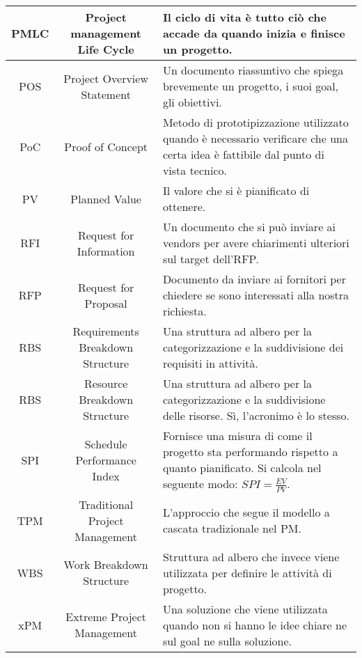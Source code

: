 \begin{tabularx}{\textwidth}{|c|c|X|}
	\hline
	PMLC & Project management Life Cycle & Il ciclo di vita è tutto ciò che accade da quando inizia e finisce un progetto.\\
	\hline
	POS & Project Overview Statement & Un documento riassuntivo che spiega brevemente un progetto, i suoi goal, gli obiettivi. \\
	\hline
	PoC & Proof of Concept & Metodo di prototipizzazione utilizzato quando è necessario verificare che una certa idea è fattibile dal punto di vista tecnico.\\
	\hline
	PV & Planned Value & Il valore che si è pianificato di ottenere.\\
	\hline
	RFI & Request for Information & Un documento che si può inviare ai vendors per avere chiarimenti ulteriori sul target dell'RFP. \\
	\hline
	RFP & Request for Proposal & Documento da inviare ai fornitori per chiedere se sono interessati alla nostra richiesta. \\
	\hline
	RBS & Requirements Breakdown Structure & Una struttura ad albero per la categorizzazione e la suddivisione dei requisiti in attività. \\
	\hline
	RBS & Resource Breakdown Structure & Una struttura ad albero per la categorizzazione e la suddivisione delle risorse. Sì, l'acronimo è lo stesso. \\
	\hline
	SPI & Schedule Performance Index & Fornisce una misura di come il progetto sta performando rispetto a quanto
	pianificato. Si calcola nel seguente modo: $SPI = \frac{EV}{PV}$.\\
	\hline
	TPM & Traditional Project Management & L'approccio che segue il modello a cascata tradizionale nel PM. \\
	\hline
	WBS & Work Breakdown Structure & Struttura ad albero che invece viene utilizzata per definire le attività di progetto.\\
	\hline
	xPM & Extreme Project Management &  Una soluzione che viene utilizzata quando non si hanno le idee chiare ne sul goal ne sulla soluzione.\\
	\hline
\end{tabularx}
